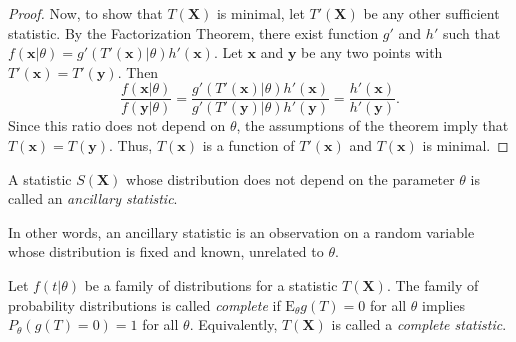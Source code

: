 \begin{proof}
Now, to show that $T(\mathbf{X})$ is minimal, let $T'(\mathbf{X})$ be any other sufficient statistic.
By the Factorization Theorem, there exist function $g'$ and $h'$ such that $f(\mathbf{x}|\theta) = g'(T'(\mathbf{x})|\theta)h'(\mathbf{x})$.
Let $\mathbf{x}$ and $\mathbf{y}$ be any two points with $T'(\mathbf{x}) = T'(\mathbf{y})$.
Then
\begin{equation*}
\frac{ f(\mathbf{x}|\theta) }{ f(\mathbf{y}|\theta) }
= \frac{ g'(T'(\mathbf{x})|\theta)h'(\mathbf{x}) }{ g'(T'(\mathbf{y})|\theta)h'(\mathbf{y}) }
= \frac{ h'(\mathbf{x}) }{ h'(\mathbf{y}) } .
\end{equation*}
Since this ratio does not depend on $\theta$, the assumptions of the theorem imply that $T(\mathbf{x}) = T(\mathbf{y})$.
Thus, $T(\mathbf{x})$ is a function of $T'(\mathbf{x})$ and $T(\mathbf{x})$ is minimal.
\end{proof}

\begin{definition}
A statistic $S(\mathbf{X})$ whose distribution does not depend on the parameter $\theta$ is called an \emph{ancillary statistic}.
\end{definition}

In other words, an ancillary statistic is an observation on a random variable whose distribution is fixed and known, unrelated to $\theta$.

\begin{definition}
Let $f(t|\theta)$ be a family of distributions for a statistic $T(\mathbf{X})$.
The family of probability distributions is called \emph{complete} if $\mathrm{E}_{\theta} g(T) = 0$ for all $\theta$ implies $P_{\theta} (g(T) = 0) = 1$ for all $\theta$.
Equivalently, $T(\mathbf{X})$ is called a \emph{complete statistic}.
\end{definition}


